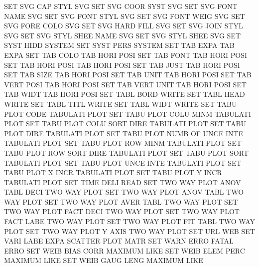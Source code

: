 SET      SVG  CAP  STYL                 SVG
SET      SVG  COOR SYST                 SVG
SET      SVG  FONT NAME                 SVG
SET      SVG  FONT STYL                 SVG
SET      SVG  FONT WEIG                 SVG
SET      SVG  FORE COLO                 SVG
SET      SVG  HARD FILL                 SVG
SET      SVG  JOIN STYL                 SVG
SET      SVG  STYL SHEE NAME            SVG
SET      SVG  STYL SHEE                 SVG
SET      SYST HIDD                      SYSTEM
SET      SYST PERS                      SYSTEM
SET      TAB  EXPA                      TAB      EXPA
SET      TAB  COLO                      TAB HORI POSI
SET      TAB  FONT                      TAB HORI POSI
SET      TAB  HORI POSI                 TAB HORI POSI
SET      TAB  JUST                      TAB HORI POSI
SET      TAB  SIZE                      TAB HORI POSI
SET      TAB  UNIT                      TAB HORI POSI
SET      TAB  VERT POSI                 TAB HORI POSI
SET      TAB  VERT UNIT                 TAB HORI POSI
SET      TAB  WIDT                      TAB HORI POSI
SET      TABL BORD                      WRITE
SET      TABL HEAD                      WRITE
SET      TABL TITL                      WRITE
SET      TABL WIDT                      WRITE
SET      TABU PLOT CODE                 TABULATI PLOT
SET      TABU PLOT COLU MINM            TABULATI PLOT
SET      TABU PLOT COLU SORT DIRE       TABULATI PLOT
SET      TABU PLOT DIRE                 TABULATI PLOT
SET      TABU PLOT NUMB OF   UNCE INTE  TABULATI PLOT
SET      TABU PLOT ROW  MINM            TABULATI PLOT
SET      TABU PLOT ROW  SORT DIRE       TABULATI PLOT
SET      TABU PLOT SORT                 TABULATI PLOT
SET      TABU PLOT UNCE INTE            TABULATI PLOT
SET      TABU PLOT X    INCR            TABULATI PLOT
SET      TABU PLOT Y    INCR            TABULATI PLOT
SET      TIME DELI                      READ
SET      TWO  WAY  PLOT ANOV TABL DECI  TWO      WAY  PLOT
SET      TWO  WAY  PLOT ANOV TABL       TWO      WAY  PLOT
SET      TWO  WAY  PLOT AVER TABL       TWO      WAY  PLOT
SET      TWO  WAY  PLOT FACT DECI       TWO      WAY  PLOT
SET      TWO  WAY  PLOT FACT LABE       TWO      WAY  PLOT
SET      TWO  WAY  PLOT FIT  TABL       TWO      WAY  PLOT
SET      TWO  WAY  PLOT Y    AXIS       TWO      WAY  PLOT
SET      URL                            WEB
SET      VARI LABE EXPA                 SCATTER  PLOT MATR
SET      WARN ERRO                      FATAL    ERRO
SET      WEIB BIAS CORR                 MAXIMUM  LIKE
SET      WEIB ELEM PERC                 MAXIMUM  LIKE
SET      WEIB GAUG LENG                 MAXIMUM  LIKE

